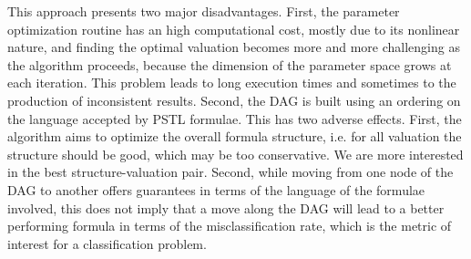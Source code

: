 This approach presents two major disadvantages.
First, the parameter optimization routine has an high computational cost, mostly due to its nonlinear nature, and finding the optimal valuation becomes more and more challenging as the algorithm proceeds, because the dimension of the parameter space grows at each iteration. 
This problem leads to long execution times and sometimes to the production of inconsistent results.
Second, the DAG is built using an ordering on the language accepted by PSTL formulae. This has two adverse effects. First, the algorithm aims to optimize the overall formula structure, i.e. for all valuation the structure should be good, which may be too conservative. 
We are more interested in the best structure-valuation pair.
Second, while moving from one node of the DAG to another offers guarantees in terms of the language of the formulae involved, this does not imply that a move along the DAG
will lead to a better performing formula in terms of the misclassification rate, which is the metric of interest for a classification problem.

